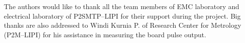 \documentclass{pj}
\begin{document}
\ack

The authors would like to thank all the team members of EMC laboratory and electrical laboratory of P2SMTP--LIPI for their support during the project. Big thanks are also addressed to Windi Kurnia P. of Research Center for Metrology (P2M--LIPI) for his assistance in measuring the board pulse output.  







\end{document}
